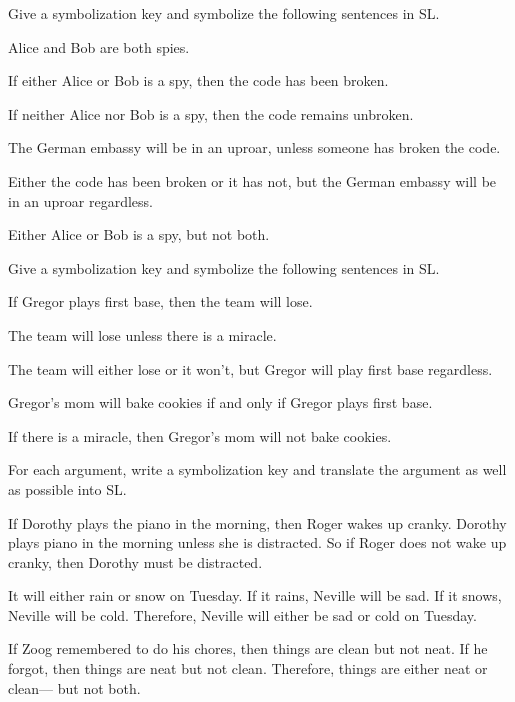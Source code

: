 

\solutions
\problempart
\label{pr.spies}
Give a symbolization key and symbolize the following sentences in SL.
\begin{earg}
\item Alice and Bob are both spies.
\item If either Alice or Bob is a spy, then the code has been broken.
\item If neither Alice nor Bob is a spy, then the code remains unbroken.
\item The German embassy will be in an uproar, unless someone has broken the code.
\item Either the code has been broken or it has not, but the German embassy will be in an uproar regardless.
\item Either Alice or Bob is a spy, but not both.
\end{earg}


\problempart Give a symbolization key and symbolize the following sentences in SL.
\begin{earg}
\item If Gregor plays first base, then the team will lose.
\item The team will lose unless there is a miracle.
\item The team will either lose or it won't, but Gregor will play first base regardless.
\item Gregor's mom will bake cookies if and only if Gregor plays first base.
\item If there is a miracle, then Gregor's mom will not bake cookies.
\end{earg}


\problempart
For each argument, write a symbolization key and translate the argument as well as possible into SL.
\begin{earg}
\item If Dorothy plays the piano in the morning, then Roger wakes up cranky. Dorothy plays piano in the morning unless she is distracted. So if Roger does not wake up cranky, then Dorothy must be distracted.
\item It will either rain or snow on Tuesday. If it rains, Neville will be sad. If it snows, Neville will be cold. Therefore, Neville will either be sad or cold on Tuesday.
\item If Zoog remembered to do his chores, then things are clean but not neat. If he forgot, then things are neat but not clean. Therefore, things are either neat or clean--- but not both.
\end{earg}



